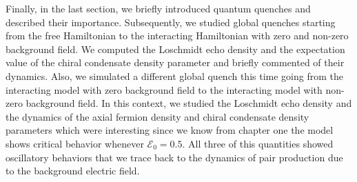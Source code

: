 Finally, in the last section, we briefly introduced quantum quenches and described their importance. Subsequently, we studied global quenches starting from the free Hamiltonian to the interacting Hamiltonian with zero and non-zero background field. We computed the Loschmidt echo density and the expectation value of the chiral condensate density parameter and briefly commented of their dynamics. Also, we simulated a different global quench this time going from the interacting model with zero background field to the interacting model with non-zero background field. In this context, we studied the Loschmidt echo density and the dynamics of the axial fermion density and chiral condensate density parameters which were interesting since we know from chapter one the model shows critical behavior whenever $\mathcal{E}_0=0.5$. All three of this quantities showed oscillatory behaviors that we trace back to the dynamics of pair production due to the background electric field.


